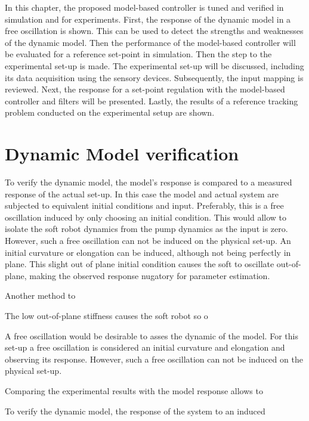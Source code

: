 \label{chap5}

In this chapter, the proposed model-based controller is tuned and verified in simulation and for experiments. First, the response of the dynamic model in a free oscillation is shown. This can be used to detect the strengths and weaknesses of the dynamic model. Then the performance of the model-based controller will be evaluated for a reference set-point in simulation. Then the step to the experimental set-up is made. The experimental set-up will be discussed, including its data acquisition using the sensory devices. Subsequently, the input mapping is reviewed. Next, the response for a set-point regulation with the model-based controller and filters will be presented. Lastly, the results of a reference tracking problem conducted on the experimental setup are shown. 

\section{Dynamic Model verification}

To verify the dynamic model, the model's response is compared to a measured response of the actual set-up. In this case the model and actual system are subjected to equivalent initial conditions and input. Preferably, this is a free oscillation induced by only choosing an initial condition. This would allow to isolate the soft robot dynamics from the pump dynamics as the input is zero. However, such a free oscillation can not be induced on the physical set-up. An initial curvature or elongation can be induced, although not being perfectly in plane. This slight out of plane initial condition causes the soft to oscillate out-of-plane, making the observed response nugatory for parameter estimation.

Another method to 




The low out-of-plane stiffness causes the soft robot so o



A free oscillation would be desirable to asses the dynamic of the model. For this set-up a free oscillation is considered an initial curvature and elongation and observing its response. However, such a free oscillation can not be induced on the physical set-up. 



Comparing the experimental results with the model response allows to 


To verify the dynamic model, the response of the system to an induced 





